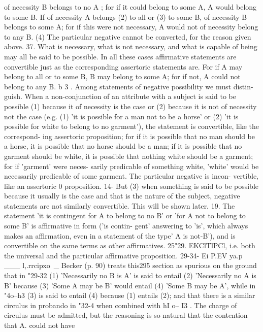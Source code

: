 {of necessity B belongs to no A ; for if it could belong to some A,
A would belong to some B. If of necessity A belongs (2) to all or
(3) to some B, of necessity B belongs to some A; for if this were
not necessary, A would not of necessity belong to any B. (4) The
particular negative cannot be converted, for the reason given
above.
37. What is necessary, what is not necessary, and what is
capable of being may all be said to be possible. In all these cases
affirmative statements are convertible just as the corresponding
assertoric statements are. For if A may belong to all or to some
B, B may belong to some A; for if not, A could not belong to
any B.
b 3 . Among statements of negative possibility we must distin-
guish. When a non-conjunction of an attribute with a subject is
said to be possible (1) because it of necessity is the case or (2)
because it is not of necessity not the case (e.g. (1) 'it is possible
for a man not to be a horse' or (2) 'it is possible for white to belong
to no garment'), the statement is convertible, like the correspond-
ing assertoric proposition; for if it is possible that no man should
be a horse, it is possible that no horse should be a man; if it is
possible that no garment should be white, it is possible that
nothing white should be a garment; for if 'garment' were neces-
sarily predicable of something white, 'white' would be necessarily
predicable of some garment. The particular negative is incon-
vertible, like an assertoric 0 proposition.
14- But (3) when something is said to be possible because it
usually is the case and that is the nature of the subject, negative
statements are not similarly convertible. This will be shown later.
19. The statement 'it is contingent for A to belong to no B' or
'for A not to belong to some B' is affirmative in form ('is contin-
gent' answering to 'is', which always makes an affirmation, even
in a statement of the type' A is not-B'), and is convertible on the
same terms as other affirmatives.
25"29. EKClTlPCl, i.e. both the universal and the particular
affirmative proposition.
29-34- Ei P.EV ya.p ___ l,.rrcipxo~_ Becker (p. 90) treats this295
section as spurious on the ground that in "29-32 (1) 'Necessarily
no B is A' is said to entail (2) 'Necessarily no A is B' because (3)
'Some A may be B' would entail (4) 'Some B may be A', while
in "4o--h3 (3) is said to entail (4) because (1) entails (2); and that
there is a similar circulus in probando in "32-4 when combined
with hI o-- I3 . The charge of circulus must be admitted, but the
reasoning is so natural that the contention that A. could not have
}
